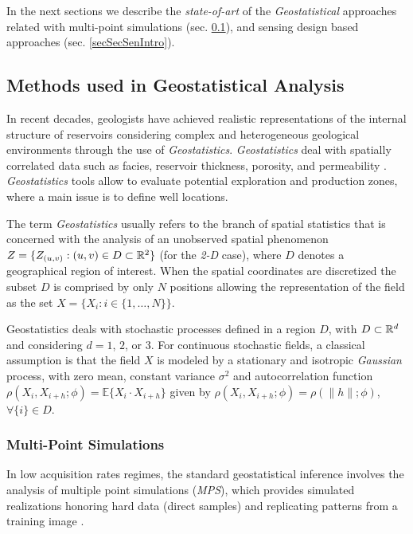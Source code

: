 In the next sections we describe the \emph{state-of-art} of the \textit{Geostatistical} approaches related with multi-point simulations (sec. \ref{secSecGeoIntro}), and sensing design based approaches (sec. \ref{secSecSenIntro}).


\subsection{Methods used in Geostatistical Analysis}
\label{secSecGeoIntro}

In recent decades, geologists have achieved realistic representations of the internal structure of reservoirs considering complex and heterogeneous geological environments through the use of \textit{Geostatistics}. \textit{Geostatistics} deal with spatially correlated data such as facies, reservoir thickness, porosity, and permeability \cite{Oliver_2008_a}. \emph{Geostatistics} tools allow to evaluate potential exploration and production zones, where a main issue is to define well locations.

The term \emph{Geostatistics} usually refers to the branch of spatial statistics that is concerned with the analysis of an unobserved  spatial  phenomenon $Z = \{Z_{(u,v) } : (u,v) \in D \subset \mathbb{R}^2 \}$ (for the \emph{2-D} case), where $D$ denotes a geographical region of interest. When the spatial coordinates are discretized the subset $D$ is comprised by only $N$ positions allowing the representation of the field as the set $X = \{X_{i} : i \in \{1,\ldots, N\} \}$.

Geostatistics deals with stochastic processes defined in a region $D$, with $D \subset \mathbb{R}^d$ and considering $d= 1$, $2$, or $3$. For continuous stochastic fields, a classical assumption is that the field $X$ is modeled by a stationary and isotropic \emph{Gaussian} process, with zero mean, constant variance $\sigma^2$ and autocorrelation function $\rho(X_{i} , X_{i+h} ; \phi) = \mathds{E} \{ X_{i} \cdot X_{i + h}  \} $ given by $\rho(X_{i} , X_{i+h} ; \phi)=\rho(\parallel h \parallel;\phi)$, $\forall \{i\} \in D$.

\subsubsection{Multi-Point Simulations}

	In low acquisition rates regimes, the standard geostatistical inference involves the analysis of multiple point simulations (\emph{MPS}), which provides simulated realizations honoring hard data (direct samples) and replicating patterns from a training image \cite{Ortiz_2004_a,Remy_2009_a}. 


